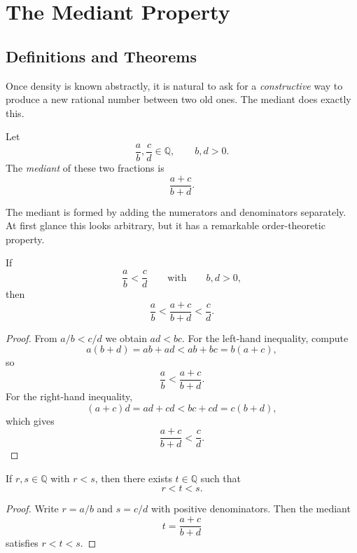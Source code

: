 
\section{The Mediant Property}
\label{sec:mediant}

\subsection{Definitions and Theorems}

Once density is known abstractly, it is natural to ask for a \emph{constructive} way to produce a
new rational number between two old ones.  The mediant does exactly this.

\begin{definition}[Mediant]
\label{def:mediant}
Let
\[
\frac{a}{b},\frac{c}{d}\in\mathbb{Q},
\qquad b,d>0.
\]
The \emph{mediant} of these two fractions is
\[
\frac{a+c}{b+d}.
\]
\end{definition}

\begin{remark}
The mediant is formed by adding the numerators and denominators separately.  At first glance this
looks arbitrary, but it has a remarkable order-theoretic property.
\end{remark}

\begin{theorem}
\label{thm:mediant-inequality}
If
\[
\frac{a}{b}<\frac{c}{d}
\qquad\text{with}\qquad b,d>0,
\]
then
\[
\frac{a}{b}<\frac{a+c}{b+d}<\frac{c}{d}.
\]
\end{theorem}

\begin{proof}
From $a/b<c/d$ we obtain $ad<bc$.
For the left-hand inequality, compute
\[
a(b+d)=ab+ad < ab+bc = b(a+c),
\]
so
\[
\frac{a}{b}<\frac{a+c}{b+d}.
\]
For the right-hand inequality,
\[
(a+c)d = ad+cd < bc+cd = c(b+d),
\]
which gives
\[
\frac{a+c}{b+d}<\frac{c}{d}.
\]
\end{proof}

\begin{corollary}
\label{cor:q-dense-in-q}
If $r,s\in\mathbb{Q}$ with $r<s$, then there exists $t\in\mathbb{Q}$ such that
\[
r<t<s.
\]
\end{corollary}

\begin{proof}
Write $r=a/b$ and $s=c/d$ with positive denominators.  Then the mediant
\[
t=\frac{a+c}{b+d}
\]
satisfies $r<t<s$.
\end{proof}

